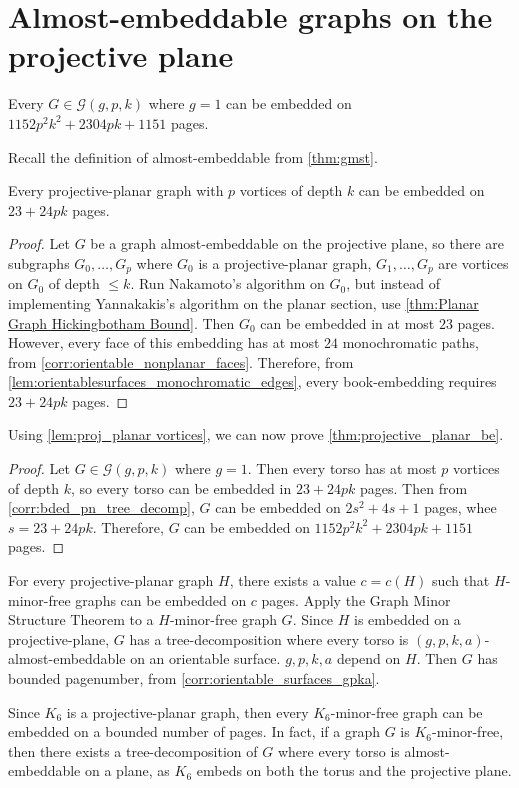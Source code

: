 
\section{Almost-embeddable graphs on the projective plane}

\begin{theorem}\label{thm:projective_planar_be}
	Every $G \in \mathcal{G}(g, p, k)$ where $g = 1$ can be embedded on $1152p^2 k^2 + 2304 pk + 1151$ pages.
\end{theorem}
Recall the definition of almost-embeddable from \cref{thm:gmst}. 
\begin{lemma}\label{lem:proj_planar vortices}
	Every projective-planar graph with $p$ vortices of depth $k$ can be embedded on $23 + 24pk$ pages.
\end{lemma}
\begin{proof}
	Let $G$ be a graph almost-embeddable on the projective plane, so there are subgraphs $G_0, \ldots, G_p$ where $G_0$ is a projective-planar graph, $G_1, \ldots, G_p$ are vortices on $G_0$ of depth $\leq k$. 
	Run Nakamoto's algorithm on $G_0$, but instead of implementing Yannakakis's algorithm on the planar section, use \cref{thm:Planar Graph Hickingbotham Bound}. Then $G_0$ can be embedded in at most $23$ pages. However, every face of this embedding has at most $24$ monochromatic paths, from \cref{corr:orientable_nonplanar_faces}. Therefore, from \cref{lem:orientablesurfaces_monochromatic_edges}, every book-embedding requires $23 + 24pk$ pages.
\end{proof}

Using \cref{lem:proj_planar vortices}, we can now prove \cref{thm:projective_planar_be}.
\begin{proof}
	Let $G \in \mathcal{G}(g, p, k)$ where $g = 1$. Then every torso has at most $p$ vortices of depth $k$, so every torso can be embedded in $23 + 24 pk$ pages. Then from \cref{corr:bded_pn_tree_decomp}, $G$ can be embedded on $2s^2 + 4s + 1$ pages, whee $s = 23 + 24pk$. Therefore, $G$ can be embedded on $1152p^2 k^2 + 2304 pk + 1151$ pages.
\end{proof}

For every projective-planar graph $H$, there exists a value $c = c(H)$ such that $H$-minor-free graphs can be embedded on $c$ pages. Apply the Graph Minor Structure Theorem to a $H$-minor-free graph $G$. Since $H$ is embedded on a projective-plane, $G$ has a tree-decomposition where every torso is $(g,p,k,a)$-almost-embeddable on an orientable surface. $g, p, k,a$ depend on $H$. Then $G$ has bounded pagenumber, from \cref{corr:orientable_surfaces_gpka}.

Since $K_6$ is a projective-planar graph, then every $K_6$-minor-free graph can be embedded on a bounded number of pages. In fact, if a graph $G$ is $K_6$-minor-free, then there exists a tree-decomposition of $G$ where every torso is almost-embeddable on a plane, as $K_6$ embeds on both the torus and the projective plane. 